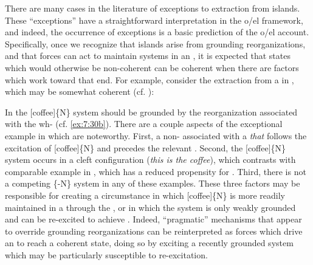   \ea\label{ex:7:29}
  \label{ex:7:29a}
  \label{ex:7:29b}
  \label{ex:7:29c}
  \z
  \z
  
  There are many cases in the literature of exceptions to extraction from islands. These “exceptions” have a straightforward interpretation in the o/el framework, and indeed, the occurrence of exceptions is a basic prediction of the o/el account. Specifically, once we recognize that islands arise from grounding reorganizations, and that  forces can act to maintain systems in an , it is expected that states which would otherwise be non-coherent can be coherent when there are factors which work toward that end. For example, consider the extraction from a  in , which may be somewhat coherent (cf. \citep{Erteschik-ShirLappin1979,Truswell2011}):

\ea  \label{ex:7:30}
\z
\z

In  the [coffee]\{N\} system should be grounded by the reorganization associated with the wh- (cf. \ref{ex:7:30b}). There are a couple aspects of the exceptional example in  which are noteworthy. First, a non- associated with a \textit{that}  follows the excitation of [coffee]\{N\} and precedes the relevant . Second, the [coffee]\{N\} system occurs in a cleft configuration (\textit{this is the coffee}), which contrasts with comparable example in , which has a reduced propensity for . Third, there is not a competing \{-N\} system in any of these examples. These three factors may be responsible for creating a circumstance in which [coffee]\{N\} is more readily maintained in a  through the , or in which the system is only weakly grounded and can be re-excited to achieve . Indeed, “pragmatic” mechanisms that appear to override grounding reorganizations can be reinterpreted as forces which drive an  to reach a coherent state, doing so by exciting a recently grounded system which may be particularly susceptible to re-excitation.

